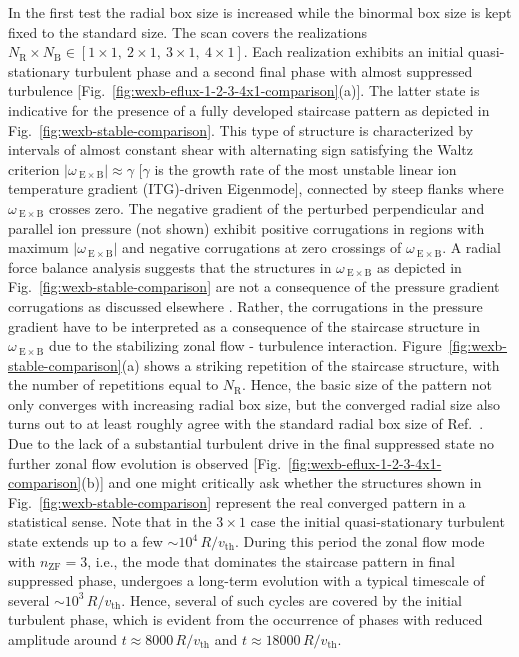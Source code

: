 \documentclass[aip, amsmath, amssymb, reprint, twocolumn, floatfix]{revtex4-1}
\newcommand{\wexb}{\omega_{\mathrm{\:E \times B}}}
\newcommand{\NR}{N_\mathrm{R}}
\newcommand{\NB}{N_\mathrm{B}}
\newcommand{\vth}{v_{\mathrm{th}}}
\newcommand{\nzf}{n_\mathrm{ZF}}
\begin{document}
In the first test the radial box size is increased while the binormal box size is kept fixed to the standard size. The scan covers the realizations $\NR\times\NB \in [ 1\times1,~2\times1,~3\times1,~4\times1]$.
Each realization exhibits an initial quasi-stationary turbulent phase and a second final \cite{Peeters2016} phase with almost suppressed turbulence [Fig.~\ref{fig:wexb-eflux-1-2-3-4x1-comparison}(a)].
The latter state is indicative for the presence of a fully developed staircase pattern as depicted in Fig.~\ref{fig:wexb-stable-comparison}. 
This type of structure is characterized by intervals of almost constant shear with alternating sign satisfying the Waltz criterion $|\wexb| \approx \gamma$\cite{Waltz1994, Waltz1998} [$\gamma$ is the growth rate of the most unstable linear ion temperature gradient (ITG)-driven Eigenmode], connected by steep flanks where $\wexb$ crosses zero.
The negative gradient of the perturbed perpendicular and parallel ion pressure (not shown) exhibit positive corrugations in regions with maximum $|\wexb|$ and negative corrugations at zero crossings of $\wexb$. 
A radial force balance analysis suggests that the structures in $\wexb$ as depicted in Fig.~\ref{fig:wexb-stable-comparison} are not a consequence of the pressure gradient corrugations as discussed elsewhere \cite{Kosuga2013}.
Rather, the corrugations in the pressure gradient have to be interpreted as a consequence of the staircase structure in $\wexb$ due to the stabilizing zonal flow - turbulence interaction.
Figure~\ref{fig:wexb-stable-comparison}(a) shows a striking repetition of the staircase structure, with the number of repetitions equal to $\NR$.
Hence, the basic size of the pattern not only converges with increasing radial box size, but the converged radial size also turns out to at least roughly agree with the standard radial box size of Ref.~.
Due to the lack of a substantial turbulent drive in the final suppressed state no further zonal flow evolution is observed [Fig.~\ref{fig:wexb-eflux-1-2-3-4x1-comparison}(b)] and one might critically ask whether the structures shown in Fig.~\ref{fig:wexb-stable-comparison} represent the real converged pattern in a statistical sense. 
Note that in the $3 \times 1$ case the initial quasi-stationary turbulent state extends up to a few $\sim 10^4\,R/\vth$.
During this period the zonal flow mode with $\nzf = 3$, i.e., the mode that dominates the staircase pattern in final suppressed phase, undergoes a long-term evolution with a typical timescale of several $\sim 10^3\,R/\vth$. 
Hence, several of such cycles are covered by the initial turbulent phase, which is evident from the occurrence of phases with reduced amplitude around $t \approx 8000\,R/\vth$ and $t \approx 18000\,R/\vth$.
\end{document}
